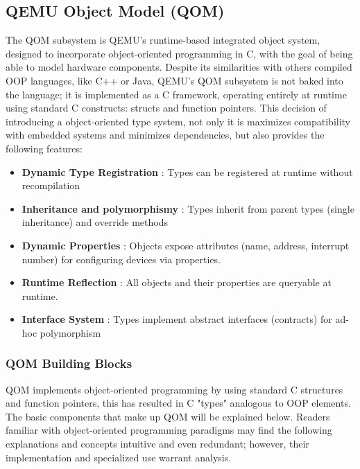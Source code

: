 \subsection{QEMU Object Model (QOM)}
\label{chap:QEMU_QOM}


The QOM subsystem is QEMU's runtime-based integrated object system, 
designed to incorporate object-oriented programming in C, with the goal of being 
able to model hardware components. Despite its similarities with others compiled 
OOP languages, like C++ or Java, QEMU's QOM subsystem is not baked into the 
language; it is implemented as a C framework, operating entirely at runtime using 
standard C constructs: structs and function pointers. This decision of introducing a 
object-oriented type system, not only it is maximizes compatibility with embedded 
systems and minimizes dependencies, but also provides the following features\cite{Qemu_QOM}:

\begin{itemize}
    \item \textbf{Dynamic Type Registration }: Types can be registered at runtime without 
                                                recompilation
        
    \item \textbf{Inheritance and polymorphismy }: Types inherit from parent types (single 
                                                    inheritance) and override methods
    
    \item \textbf{Dynamic Properties }: Objects expose attributes (name, address, 
                                        interrupt number) for configuring devices via properties.
    
    \item \textbf{Runtime Reflection }: All objects and their properties are queryable at 
                                        runtime.  
    
    \item \textbf{Interface System   }: Types implement abstract interfaces (contracts) for 
                                        ad-hoc polymorphism
\end{itemize}


\subsubsection{QOM Building Blocks}

QOM implements object-oriented programming by using standard C structures 
and function pointers, this has resulted in C "types" analogous to OOP elements. 
The basic components that make up QOM will be explained below. Readers familiar 
with object-oriented programming paradigms may find the following explanations 
and concepts intuitive and even redundant; however, their implementation and 
specialized use warrant analysis.

